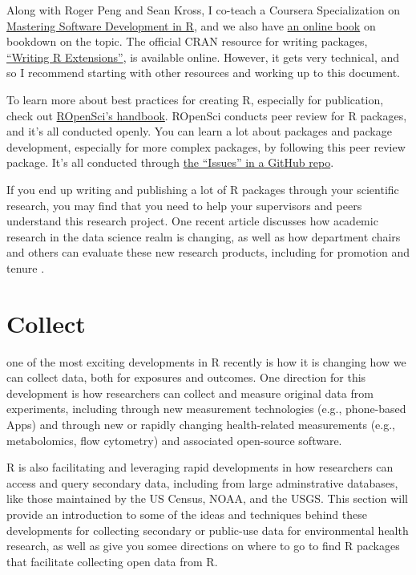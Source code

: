 \documentclass[]{tufte-book}
\begin{document}
Along with Roger Peng and Sean Kross, I co-teach a Coursera Specialization on
\href{https://www.coursera.org/specializations/r}{Mastering Software Development in
R}, and we also have \href{https://bookdown.org/rdpeng/RProgDA/}{an online
book} on bookdown on the topic. The
official CRAN resource for writing packages, \href{https://cran.r-project.org/doc/manuals/r-release/R-exts.html}{``Writing R
Extensions''}, is
available online. However, it gets very technical, and so I recommend starting
with other resources and working up to this document.

To learn more about best practices for creating R, especially for publication,
check out \href{https://ropensci.github.io/dev_guide/}{ROpenSci's handbook}. ROpenSci
conducts peer review for R packages, and it's all conducted openly. You can
learn a lot about packages and package development, especially for more complex
packages, by following this peer review package. It's all conducted through \href{https://github.com/ropensci/software-review/issues}{the
``Issues'' in a GitHub repo}.

If you end up writing and publishing a lot of R packages through your scientific
research, you may find that you need to help your supervisors and peers
understand this research project. One recent article discusses how academic
research in the data science realm is changing, as well as how department chairs
and others can evaluate these new research products, including for promotion and
tenure \citep{waller2018documenting}.

\hypertarget{collect}{%
\chapter{Collect}\label{collect}}

 one of the most exciting
developments in R recently is how it is changing how we can collect data, both for
exposures and outcomes. One direction for this development is how researchers can
collect and measure original data from experiments, including through new measurement
technologies (e.g., phone-based Apps) and through new or rapidly changing health-related
measurements (e.g., metabolomics, flow cytometry) and associated open-source
software.

R is also facilitating and leveraging rapid developments in how researchers can access and
query secondary data, including from large adminstrative databases, like those maintained
by the US Census, NOAA, and the USGS. This section will provide an
introduction to some of the ideas and techniques behind these developments for
collecting secondary or public-use data for environmental health research, as well as
give you somee directions on where to go to find R packages that facilitate collecting
open data from R.
\end{document}
